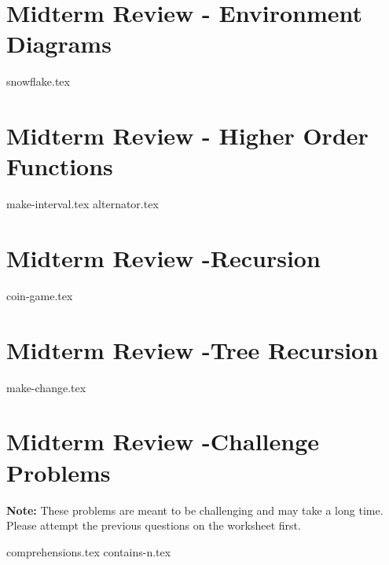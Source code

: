 \documentclass{exam}
\begin{document}
\newpage
\section{Midterm Review - Environment Diagrams}
\begin{questions}
{snowflake.tex}
\end{questions}

\newpage
\section{Midterm Review - Higher Order Functions}
\begin{questions}
{make-interval.tex}
{alternator.tex}
\end{questions}

\section{Midterm Review -Recursion}
\begin{questions}
{coin-game.tex}
\end{questions}

\section{Midterm Review -Tree Recursion}
\begin{questions}
{make-change.tex}
\end{questions}

\newpage
\section{Midterm Review -Challenge Problems}
\textbf{Note:} These problems are meant to be challenging and may take a long time. Please attempt the previous questions on the worksheet first.
\begin{questions}
{comprehensions.tex}
\newpage
{contains-n.tex}
\end{questions}
\end{document}

